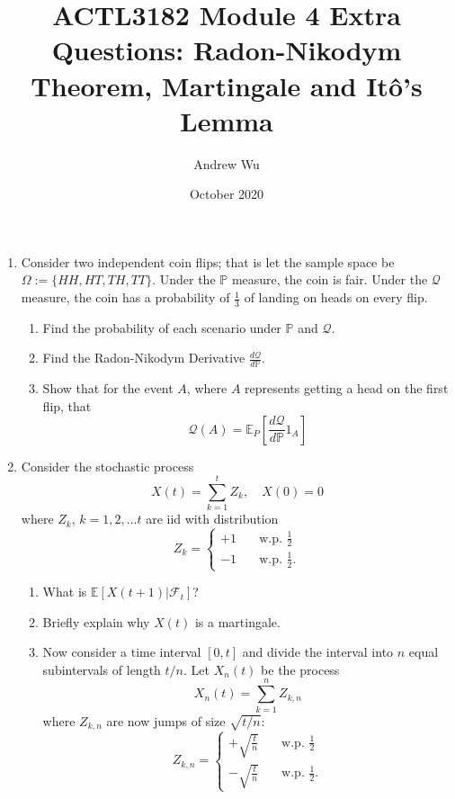 \documentclass[11pt]{article}
\title{\textbf{ACTL3182 Module 4 Extra Questions: Radon-Nikodym Theorem, Martingale and It\^o's Lemma}}
\author{Andrew Wu}
\date{October 2020}
\newcommand{\E}{\mathbb{E}}
\newcommand{\PR}{\mathbb{P}}
\newcommand{\Q}{\mathcal{Q}}
\begin{document}
	\maketitle
	\begin{enumerate}
		\item Consider two independent coin flips; that is let the sample space be $\Omega:=\{HH, HT, TH, TT\}$. Under the $\PR$ measure, the coin is fair. Under the $\Q$ measure, the coin has a probability of $\frac{1}{3}$ of landing on heads on every flip. 
		\begin{enumerate}
			\item Find the probability of each scenario under $\PR$ and $\Q$.
			\item Find the Radon-Nikodym Derivative $\frac{d\Q}{d\PR}$.
			\item Show that for the event $A$, where $A$ represents getting a head on the first flip, that
			\[	\Q(A) = \E_{P}\left[\frac{d\Q}{d\PR}1_{A}\right]
					\]
 		\end{enumerate}
		\item Consider the stochastic process 
		\[	X(t) = \sum_{k=1}^{t}Z_{k},\quad X(0) = 0
			\]
		where $Z_{k}$, $k=1,2,...t$ are iid with distribution 
		\[	Z_{k} = \begin{cases}
						+1 &  \quad \text{w.p. } \frac{1}{2} \\
						-1 & \quad \text{w.p. } \frac{1}{2}.
						\end{cases}
			\]
			\begin{enumerate}
				\item What is $\E[X(t+1)|\mathcal{F}_{t}]$?
				\item Briefly explain why $X(t)$ is a martingale.
				\item Now consider a time interval $[0, t]$ and divide the interval into $n$ equal subintervals of length $t/n$. Let $X_{n}(t)$ be the process
				\[	X_{n}(t) = \sum_{k=1}^{n}Z_{k, n}
				\]
				where $Z_{k, n}$ are now jumps of size $\sqrt{t/n}$:
				\[	Z_{k, n} = \begin{cases}
				+\sqrt{\frac{t}{n}} &  \quad \text{w.p. } \frac{1}{2} \\[5pt]
				-\sqrt{\frac{t}{n}} & \quad \text{w.p. } \frac{1}{2}.
				\end{cases}
				\]
				

\end{enumerate}
\end{enumerate}
\end{document}
